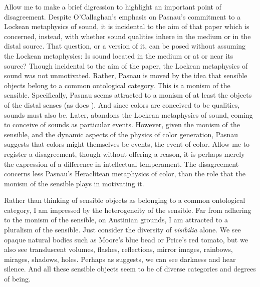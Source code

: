 Allow me to make a brief digression to highlight an important point of disagreement. Despite O'Callaghan's \citeyearpar{OCallaghan:2009aa} emphasis on Pasnau's \citeyearpar{Pasnau:1999ss} commitment to a Lockean metaphysics of sound, it is incidental to the aim of that paper which is concerned, instead, with whether sound qualities inhere in the medium or in the distal source. That question, or a version of it, can be posed without assuming the Lockean metaphysics: Is sound located in the medium or at or near its source? Though incidental to the aim of the paper, the Lockean metaphysics of sound was not unmotivated. Rather, Pasnau is moved by the idea that sensible objects belong to a common ontological category. This is a monism of the sensible. Specifically, Pasnau seems attracted to a monism of at least the objects of the distal senses (as does \citealt{Kulvicki:2008aa}). And since colors are conceived to be qualities, sounds must also be. Later, \citet{Pasnau:2009ys} abandons the Lockean metaphysics of sound, coming to conceive of sounds as particular events. However, given the monism of the sensible, and the dynamic aspects of the physics of color generation, Pasnau suggests that colors might themselves be events, the event of color. Allow me to register a disagreement, though without offering a reason, it is perhaps merely the expression of a difference in intellectual temperament. The disagreement concerns less Pasnau's Heraclitean metaphysics of color, than the role that the monism of the sensible plays in motivating it. 

Rather than thinking of sensible objects as belonging to a common ontological category, I am impressed by the heterogeneity of the sensible. Far from adhering to the monism of the sensible, on Austinian grounds, I am attracted to a pluralism of the sensible. Just consider the diversity of \emph{visibilia} alone. We see opaque natural bodies such as Moore's \citeyearpar{Moore:1903uo} blue bead or Price's \citeyearpar{Price:1932fk} red tomato, but we also see transluscent volumes, flashes, reflections, mirror images, rainbows, mirages, shadows, holes. Perhaps as \citet{Sorensen:2004jk,Sorensen:2008kx,Sorensen:2009aa} suggests, we can see darkness and hear silence. And all these sensible objects seem to be of diverse categories and degrees of being.

